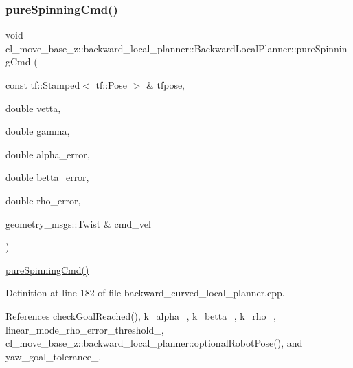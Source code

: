 \mbox{\label{classcl__move__base__z_1_1backward__local__planner_1_1BackwardLocalPlanner_aaa88a0a47e7cfd449c59518577599928}} 
\subsubsection{\texorpdfstring{pure\+Spinning\+Cmd()}{pureSpinningCmd()}}
{\footnotesize\ttfamily void cl\+\_\+move\+\_\+base\+\_\+z\+::backward\+\_\+local\+\_\+planner\+::\+Backward\+Local\+Planner\+::pure\+Spinning\+Cmd (\begin{DoxyParamCaption}\item[{const tf\+::\+Stamped$<$ tf\+::\+Pose $>$ \&}]{tfpose,  }\item[{double}]{vetta,  }\item[{double}]{gamma,  }\item[{double}]{alpha\+\_\+error,  }\item[{double}]{betta\+\_\+error,  }\item[{double}]{rho\+\_\+error,  }\item[{geometry\+\_\+msgs\+::\+Twist \&}]{cmd\+\_\+vel }\end{DoxyParamCaption})\hspace{0.3cm}{\ttfamily [private]}}

\hyperlink{classcl__move__base__z_1_1backward__local__planner_1_1BackwardLocalPlanner_aaa88a0a47e7cfd449c59518577599928}{pure\+Spinning\+Cmd()} 

Definition at line 182 of file backward\+\_\+curved\+\_\+local\+\_\+planner.\+cpp.



References check\+Goal\+Reached(), k\+\_\+alpha\+\_\+, k\+\_\+betta\+\_\+, k\+\_\+rho\+\_\+, linear\+\_\+mode\+\_\+rho\+\_\+error\+\_\+threshold\+\_\+, cl\+\_\+move\+\_\+base\+\_\+z\+::backward\+\_\+local\+\_\+planner\+::optional\+Robot\+Pose(), and yaw\+\_\+goal\+\_\+tolerance\+\_\+.



